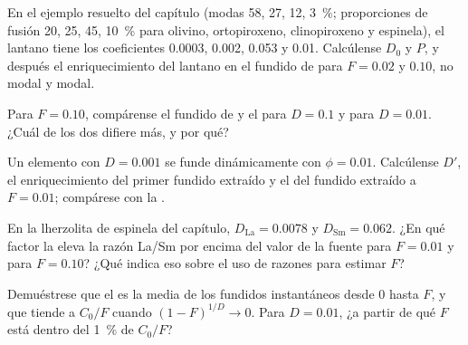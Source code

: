 \begin{exercise}[$\star\star$]\label{exo:b3:trace-element-modelling:6}
En el ejemplo resuelto del capítulo (modas 58, 27, 12, \qty{3}{\percent};
proporciones de fusión 20, 25, 45, \qty{10}{\percent} para olivino,
ortopiroxeno, clinopiroxeno y espinela), el lantano tiene los coeficientes
0.0003, 0.002, 0.053 y 0.01. Calcúlense $D_0$ y $P$, y después el enriquecimiento del
lantano en el fundido de  para $F = 0.02$ y $0.10$, no modal y modal.
\end{exercise}

\begin{exercise}[$\star\star$]\label{exo:b3:trace-element-modelling:7}
Para $F = 0.10$, compárense el fundido de  y el  para $D = 0.1$ y para $D = 0.01$. ¿Cuál de los dos difiere más, y por qué?
\end{exercise}

\begin{exercise}[$\star\star$]\label{exo:b3:trace-element-modelling:8}
Un elemento con $D = 0.001$ se funde dinámicamente con $\phi = 0.01$. Calcúlense
$D'$, el enriquecimiento del primer fundido extraído y el del fundido extraído
a $F = 0.01$; compárese con la .
\end{exercise}

\begin{exercise}[$\star\star$]\label{exo:b3:trace-element-modelling:9}
En la lherzolita de espinela del capítulo, $D_{\mathrm{La}} = 0.0078$ y
$D_{\mathrm{Sm}} = 0.062$. ¿En qué factor la  eleva la razón La/Sm
por encima del valor de la fuente para $F = 0.01$ y para $F = 0.10$? ¿Qué indica eso
sobre el uso de razones para estimar $F$?
\end{exercise}

\begin{exercise}[$\star\star\star$]\label{exo:b3:trace-element-modelling:10}
Demuéstrese que el  es la media de los fundidos
instantáneos desde 0 hasta $F$, y que tiende a $C_0/F$ cuando $(1 - F)^{1/D} \to 0$.
Para $D = 0.01$, ¿a partir de qué $F$ está dentro del \qty{1}{\percent} de $C_0/F$?
\end{exercise}

